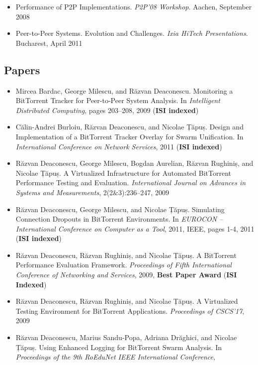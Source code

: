 \begin{itemize}
  \item Performance of P2P Implementations. \textit{P2P'08 Workshop}. Aachen,
  September 2008
  \item Peer-to-Peer Systems. Evolution and Challenges. \textit{Ixia HiTech
  Presentations}. Bucharest, April 2011
\end{itemize}

\subsection{Papers}

\begin{itemize}
  \item Mircea Bardac, George Milescu, and Răzvan Deaconescu. Monitoring a
  BitTorrent Tracker for Peer-to-Peer System Analysis. In \textit{Intelligent
  Distributed Computing}, pages 203--208, 2009 (\textbf{ISI indexed})
  \item Călin-Andrei Burloiu, Răzvan Deaconescu, and Nicolae Țăpuș. Design and
  Implementation of a BitTorrent Tracker Overlay for Swarm Unification. In
  \textit{International Conference on Network Services}, 2011 (\textbf{ISI
  indexed})
  \item Răzvan Deaconescu, George Milescu, Bogdan Aurelian, Răzvan Rughiniș,
  and Nicolae Țăpuș. A Virtualized Infrastructure for Automated BitTorrent
  Performance Testing and Evaluation. \textit{International Journal on
  Advances in Systems and Measurements}, 2(2\&3):236--247, 2009
  \item Răzvan Deaconescu, George Milescu, and Nicolae Țăpuș. Simulating
  Connection Dropouts in BitTorrent Environments. In \textit{EUROCON --
  International Conference on Computer as a Tool}, 2011, IEEE, pages 1-4, 2011
  (\textbf{ISI indexed})
  \item Răzvan Deaconescu, Răzvan Rughiniș, and Nicolae Țăpuș. A BitTorrent
  Performance Evaluation Framework. \textit{Proceedings of Fifth International
  Conference of Networking and Services}, 2009, \textbf{Best Paper Award}
  (\textbf{ISI Indexed})
  \item Răzvan Deaconescu, Răzvan Rughiniș, and Nicolae Țăpuș. A Virtualized
  Testing Environment for BitTorrent Applications. \textit{Proceedings of
  CSCS'17}, 2009
  \item Răzvan Deaconescu, Marius Sandu-Popa, Adriana Drăghici, and Nicolae
  Țăpuș. Using Enhanced Logging for BitTorrent Swarm Analysis. In
  \textit{Proceedings of the 9th RoEduNet IEEE International Conference},

\end{itemize}
